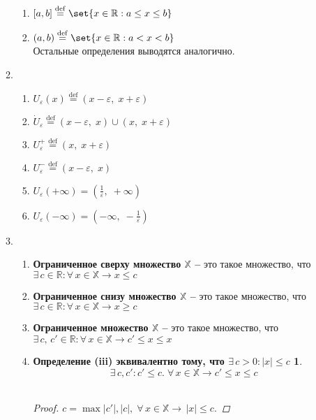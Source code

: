 \documentclass{article}
\theoremstyle{plain}
\begin{document}
\begin{enumerate}
\begin{enumerate}
    \begin{enumerate}
        \item $[a, b]\stackrel{\mathrm{def}}{=} \set{x \in \mathbb{R}: a \le x \le b}$
        \item $(a, b)\stackrel{\mathrm{def}}{=} \set{x \in \mathbb{R}: a < x < b}$\\
        Остальные определения выводятся аналогично. 
    \end{enumerate}
    \item \begin{enumerate}
        \item $U_{\varepsilon}(x) \stackrel{\mathrm{def}}{=} (x - \varepsilon,\; x + \varepsilon)$
        \item $\Dot{U}_{\varepsilon} \stackrel{\mathrm{def}}{=} (x - \varepsilon,\; x) \cup (x,\; x + \varepsilon)$
        \item $U_{\varepsilon}^{+} \stackrel{\mathrm{def}}{=} (x,\;x + \varepsilon)$
        \item $U_{\varepsilon}^{-} \stackrel{\mathrm{def}}{=} (x - \varepsilon,\;x)$
        \item $U_{\varepsilon}(+\infty) = (\frac{1}{\varepsilon},\; +\infty)$
        \item $U_{\varepsilon}(-\infty) = (-\infty,\; -\frac{1}{\varepsilon})$
    \end{enumerate}
    \item \begin{enumerate}
        \item \textbf{Ограниченное сверху множество $\mathbb{X}$ -- } это такое множество, что $\exists\, c \in \mathbb{R}: \forall\,x\in\mathbb{X}\rightarrow x \le c$
        \item \textbf{Ограниченное снизу множество $\mathbb{X}$ -- } это такое множество, что $\exists\, c \in \mathbb{R}: \forall\,x\in\mathbb{X}\rightarrow x \ge c$
        \item \textbf{Ограниченное множество $\mathbb{X}$ -- } это такое множество, что $\exists\, c,\, c' \in \mathbb{R}: \forall\,x\in\mathbb{X}\rightarrow c' \le x \le x$
        \item \newtheorem*{theorem1*}{Определение (iii) эквивалентно тому, что $\exists\, c > 0: |x| \le c$}
        \begin{theorem1*}
        $$\exists\, c, c':  c' \le c.\; \forall\, x\in \mathbb{X}\longrightarrow c' \le x \le c$$\\
        \begin{proof}
        $c = \max{|c'|, |c|},\; \forall\, x\in \mathbb{X} \rightarrow\, |x| \le c. $

\end{proof}
\end{theorem1*}
\end{enumerate}
\end{enumerate}
\end{enumerate}
\end{document}
